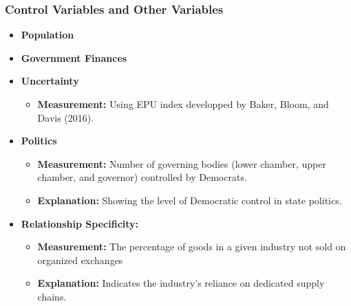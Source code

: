 \documentclass{beamer}
\begin{document}
\begin{frame}
    \frametitle{Control Variables and Other Variables}
    {\small %
    \begin{itemize}
        \item \textbf{Population}
        \item \textbf{Government Finances}
        \item \textbf{Uncertainty}
        \begin{itemize}
            \item \textbf{Measurement:} Using EPU index developped by Baker, Bloom, and Davis (2016).
        \end{itemize}
        \item \textbf{Politics}
        \begin{itemize}
            \item \textbf{Measurement:} Number of governing bodies (lower chamber, upper chamber, and governor) controlled by Democrats.
            \item \textbf{Explanation:} Showing the level of Democratic control in state politics.
        \end{itemize}
        \item \textbf{Relationship Specificity:} 
        \begin{itemize}
            \item \textbf{Measurement:} The percentage of goods in a given industry not sold on organized exchanges
            \item \textbf{Explanation:} Indicates the industry's reliance on dedicated supply chains.
        \end{itemize}
    \end{itemize}
    } %
\end{frame}
\end{document}

